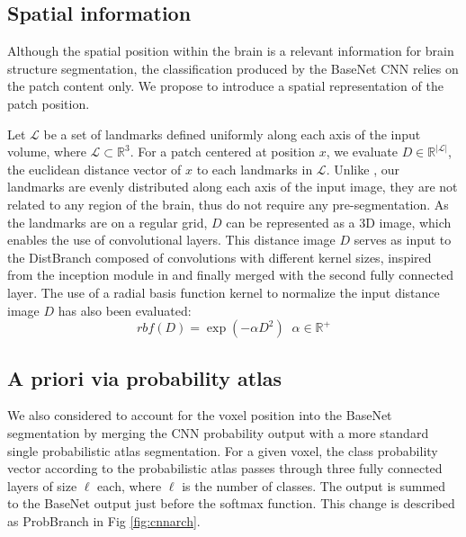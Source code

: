 \documentclass{article}
\begin{document}
\subsection{Spatial information}
Although the spatial position within the brain is a relevant information for brain structure segmentation, the classification produced by the BaseNet CNN relies on the patch content only. We propose to introduce a spatial representation of the patch position.

Let $\mathcal{L}$ be a set of landmarks defined uniformly along each axis of the input volume, where $\mathcal{L} \subset \mathbb{R}^{3}$. For a patch centered at position $x$, we evaluate $D \in \mathbb{R}^{|\mathcal{L}|}$, the euclidean distance vector of $x$ to each landmarks in $\mathcal{L}$.
Unlike \cite{brebisson,ghafoorian_deep_2017}, our landmarks are evenly distributed along each axis of the input image, they are not related to any region of the brain, thus do not require any pre-segmentation.
As the landmarks are on a regular grid, $D$ can be represented as a 3D image, which enables the use of convolutional layers.
This distance image $D$ serves as input to the DistBranch composed of convolutions with different kernel sizes, inspired from the inception module in \cite{szegedy2017inception} and finally merged with the second fully connected layer.
The use of a radial basis function kernel to normalize the input distance image $D$ has also been evaluated:
$$rbf(D) = \exp(-\alpha D^2)   \;\; \alpha \in \mathbb{R}^+$$

\subsection{A priori via probability atlas}
We also considered to account for the voxel position into the BaseNet segmentation by merging the CNN probability output with a more standard single probabilistic atlas segmentation. For a given voxel, the class probability vector according to the probabilistic atlas passes through three fully connected layers of size $\ell$ each, where $\ell$ is the number of classes. The output is summed to the BaseNet output just before the softmax function. This change is described as ProbBranch in Fig \ref{fig:cnnarch}.
\end{document}
